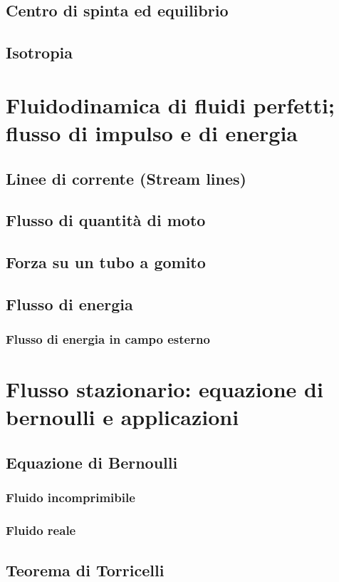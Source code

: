 \documentclass[a4paper,11pt]{report}
\begin{document}
	\section{Centro di spinta ed equilibrio}
	\section{Isotropia}
			
		
\chapter{Fluidodinamica di fluidi perfetti; flusso di impulso e di energia}
	\section{Linee di corrente (Stream lines)}
	\section{Flusso di quantità di moto}
	\section{Forza su un tubo a gomito}
	\section{Flusso di energia}
		\subsection{Flusso di energia in campo esterno}
			
\chapter{Flusso stazionario: equazione di bernoulli e applicazioni}
	\section{Equazione di Bernoulli}
		\subsection{Fluido incomprimibile}
		\subsection{Fluido reale}	
	\section{Teorema di Torricelli}
\end{document}
